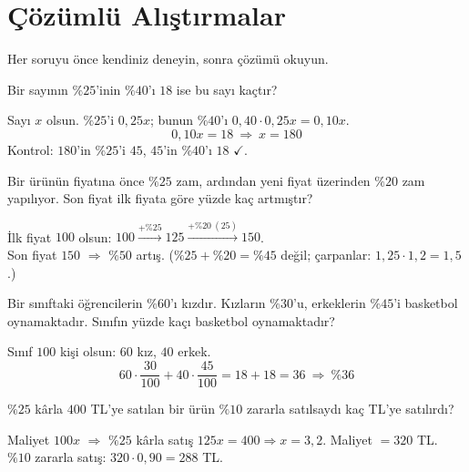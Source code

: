\section{Çözümlü Alıştırmalar}
Her soruyu önce kendiniz deneyin, sonra çözümü okuyun.

\begin{alistirma}
Bir sayının \(\%25\)'inin \(\%40\)'ı \(18\) ise bu sayı kaçtır?
\end{alistirma}
\begin{cozum}
Sayı \(x\) olsun. \(\%25\)'i \(0{,}25x\); bunun \(\%40\)'ı \(0{,}40\cdot 0{,}25x=0{,}10x\).
\[0{,}10x=18\ \Rightarrow\ x=180\]
Kontrol: \(180\)'in \(\%25\)'i \(45\), \(45\)'in \(\%40\)'ı \(18\) \(\checkmark\).
\end{cozum}

\begin{alistirma}
Bir ürünün fiyatına önce \(\%25\) zam, ardından yeni fiyat üzerinden \(\%20\) zam yapılıyor. Son fiyat ilk fiyata göre yüzde kaç artmıştır?
\end{alistirma}
\begin{cozum}
İlk fiyat \(100\) olsun: \(100\xrightarrow{+\%25}125\xrightarrow{+\%20\ (25)}150\).\\
Son fiyat \(150\) \(\Rightarrow\) \(\%50\) artış. (\(\%25+\%20=\%45\) değil; çarpanlar: \(1{,}25\cdot 1{,}2=1{,}5\).)
\end{cozum}

\begin{alistirma}
Bir sınıftaki öğrencilerin \(\%60\)'ı kızdır. Kızların \(\%30\)'u, erkeklerin \(\%45\)'i basketbol oynamaktadır. Sınıfın yüzde kaçı basketbol oynamaktadır?
\end{alistirma}
\begin{cozum}
Sınıf \(100\) kişi olsun: \(60\) kız, \(40\) erkek.
\[60\cdot\frac{30}{100}+40\cdot\frac{45}{100}=18+18=36\ \Rightarrow\ \%36\]
\end{cozum}

\begin{alistirma}
\(\%25\) kârla \(400\) TL'ye satılan bir ürün \(\%10\) zararla satılsaydı kaç TL'ye satılırdı?
\end{alistirma}
\begin{cozum}
Maliyet \(100x\) \(\Rightarrow\) \(\%25\) kârla satış \(125x=400\Rightarrow x=3{,}2\). Maliyet \(=320\) TL.\\
\(\%10\) zararla satış: \(320\cdot 0{,}90=288\) TL.
\end{cozum}

